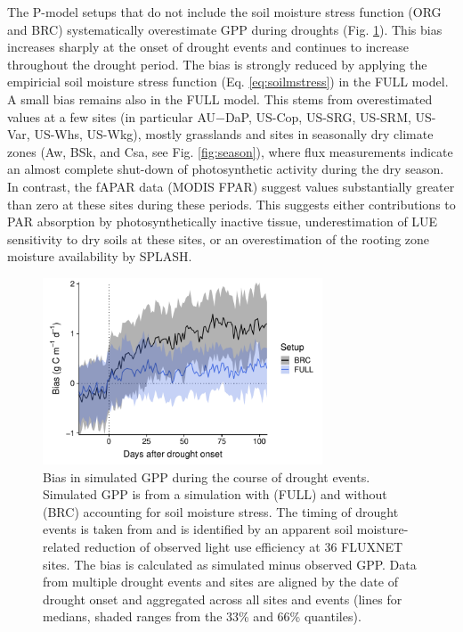 \documentclass[gmd, manuscript]{copernicus}
\begin{document}
The P-model setups that do not include the soil moisture stress function (ORG and BRC) systematically overestimate GPP during droughts (Fig. \ref{fig:modobs_droughtresponse}). This bias increases sharply at the onset of drought events and continues to increase throughout the drought period. The bias is strongly reduced by applying the empiricial soil moisture stress function (Eq. \ref{eq:soilmstress}) in the FULL model. A small bias remains also in the FULL model. This stems from overestimated values at a few sites (in particular AU−DaP, US-Cop, US-SRG, US-SRM, US-Var, US-Whs, US-Wkg), mostly grasslands and sites in seasonally dry climate zones (Aw, BSk, and Csa, see Fig. \ref{fig:season}), where flux measurements indicate an almost complete shut-down of photosynthetic activity during the dry season. In contrast, the fAPAR data (MODIS FPAR) suggest values substantially greater than zero at these sites during these periods. This suggests either contributions to PAR absorption by photosynthetically inactive tissue, underestimation of LUE sensitivity to dry soils at these sites, or an overestimation of the rooting zone moisture availability by SPLASH.

\begin{figure}[t]
\includegraphics[width=8.3cm]{fig/droughtresponse.pdf}
    \caption{Bias in simulated GPP during the course of drought events. Simulated GPP is from a simulation with (FULL) and without (BRC) accounting for soil moisture stress. The timing of drought events is taken from \citet{stocker18newphyt} and is identified by an apparent soil moisture-related reduction of observed light use efficiency at 36 FLUXNET sites. The bias is calculated as simulated minus observed GPP. Data from multiple drought events and sites are aligned by the date of drought onset and aggregated across all sites and events (lines for medians, shaded ranges from the 33\% and 66\% quantiles).}
    \label{fig:modobs_droughtresponse}
\end{figure}
\end{document}
